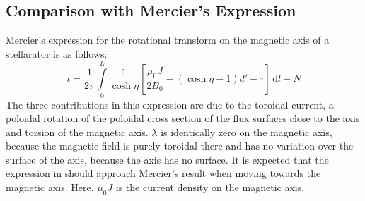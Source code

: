 \subsection{Comparison with Mercier's Expression}
Mercier's expression for the rotational transform on the magnetic axis
of a stellarator is as follows:
\begin{equation}
 \iota =
 \frac{1}{2 \pi} \int\limits_{0}^{L}
   \frac{1}{\cosh \eta} \left[
       \frac{\mu_0 J}{2 B_0}
     - \left(\cosh \eta - 1 \right) d'
     - \tau
  \right]  \,\mathrm{d}l - N
\end{equation}
The three contributions in this expression
are due to the toroidal current,
a poloidal rotation of the poloidal cross section of the flux surfaces close to the axis
and torsion of the magnetic axis.
%
$\lambda$ is identically zero on the magnetic axis,
because the magnetic field is purely toroidal there and has no variation over the surface
of the axis, because the axis has no surface.
%
It is expected that the expression in  should approach Mercier's result
when moving towards the magnetic axis.
%
Here, $\mu_0 J$ is the current density on the magnetic axis.




